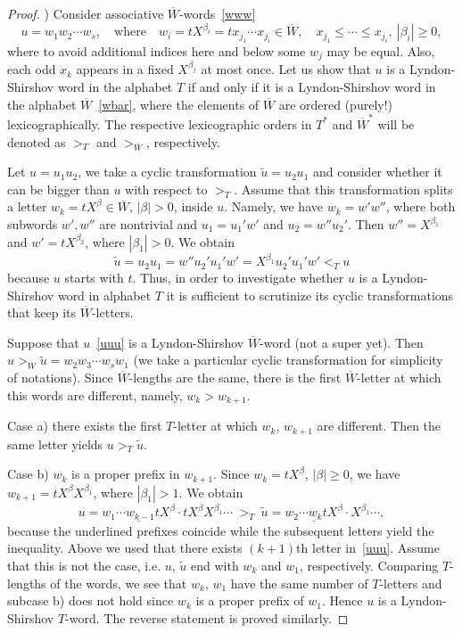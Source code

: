 \documentclass[12pt, reqno]{amsart}
\theoremstyle{remark}
\theoremstyle{definition}
\def\b{\beta}
\numberwithin{equation}{section}
\begin{document}
\begin{proof}
) Consider associative $\overline W$-words~\eqref{www}
\begin{equation}\label{uuu}
u=w_1 w_2\cdots w_s,\quad\text{where}\quad w_i=t X^{\b_i}=t x_{j_1}\cdots x_{j_i}\in \overline W, \quad    x_{j_1}\le \cdots \le x_{j_i},\ |\b_i|\ge 0,
\end{equation}
where to avoid additional indices here and below some $w_j$ may be equal. 
Also, each odd $x_k$ appears in a fixed $X^{\b_j}$ at most once.
Let us show that $u$ is a Lyndon-Shirshov word in the alphabet  $T$ if and only if it is a Lyndon-Shirshov word in the alphabet $\overline W$~\eqref{wbar}, 
where the elements of  $\overline W$ are ordered (purely!) lexicographically. 
The respective lexicographic orders in $T ^*$ and ${\overline{W}} ^*$  will be denoted as $>_{T}$ and $>_{\overline W}$, respectively.

Let $u=u_1u_2$, we take a cyclic transformation $\widetilde u=u_2u_1$ and consider whether it can be  bigger than $u$  with respect to $>_{T}$.
Assume that this transformation splits a letter $w_k=tX^\b\in\overline W$, $|\b|>0$, inside $u$.
Namely, we have $w_k=w'w''$, where both subwords $w',w''$ are nontrivial and $u_1=u_1'w'$ and $u_2=w''u_2'$. 
Then $w''=X^{\b_1}$ and $w'=t X^{\b_2}$, where $|\b_1|>0$.  We obtain 
$$\widetilde u=u_2u_1=w''u_2' u_1'w'= X^{\b_1} u_2' u_1'w'<_{T}u$$ 
because $u$ starts with $t$.
Thus, in order to investigate whether $u$ is a Lyndon-Shirshov word in alphabet  $T$ it is sufficient to scrutinize its cyclic transformations
that keep its $\overline W$-letters. 
 
Suppose that  $u$~\eqref{uuu} is a Lyndon-Shirshov $\overline W$-word (not a super yet).
Then $u>_{\overline W}\widetilde u=w_2w_3\cdots w_sw_1$ (we take a particular cyclic transformation for simplicity of notations). 
Since $\overline W$-lengths are the same, there is the first $\overline W$-letter at which this words are different, namely, $w_k>w_{k+1}$. 

Case a) there exists the first $T$-letter at which  $w_k$, $w_{k+1}$ are different. Then the same letter yields $u>_{T} \widetilde u$.

Case b) $w_k$ is a proper prefix in $w_{k+1}$. Since $w_k=t X^\b$, $|\b|\ge 0$,  we have $w_{k+1}=t X^\b X^{\b_1}$, where $|\b_1|>1$. We obtain
$$ u=\underline{w_1\cdots w_{k-1}t X^\b}\cdot t X^\b X^{\b_1} \cdots\ >_{T}\ \widetilde u=\underline{w_2\cdots w_{k} t X^\b}\cdot X^{\b_1}\cdots,  $$
because the underlined prefixes coincide while the subsequent letters yield the inequality. 
Above we used that there exists $(k+1)$th letter in~\eqref{uuu}. Assume that this is not the case, i.e. $u$, $\widetilde u$ end with $w_k$ and $w_1$, respectively.
Comparing $T$-lengths of the words, we see that $w_k$, $w_1$ have the same number of $T$-letters and subcase b) does not hold since $w_k$ is a proper prefix of $w_1$.  
Hence $u$ is a Lyndon-Shirshov $T$-word.
The reverse statement is proved similarly.


\end{proof}
\end{document}
